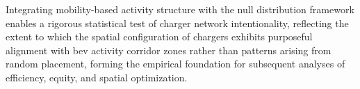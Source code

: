 Integrating mobility-based activity structure with the null distribution framework enables a rigorous statistical test of charger network intentionality, reflecting the extent to which the spatial configuration of chargers exhibits purposeful alignment with \gls{bev} activity corridor zones rather than patterns arising from random placement, forming the empirical foundation for subsequent analyses of efficiency, equity, and spatial optimization.






